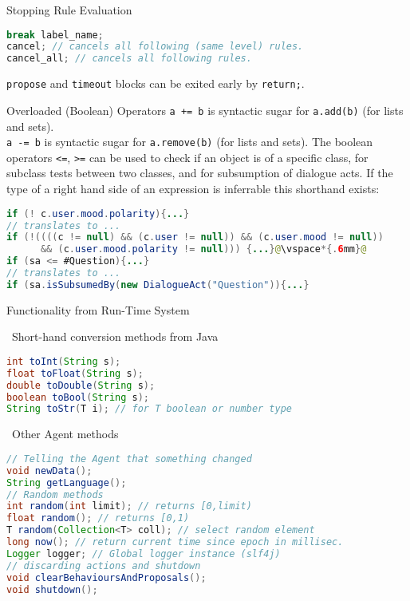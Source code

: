 \documentclass[5pt]{article}
\newcommand{\intitle}[1]{\rule{0pt}{2ex}\ #1}
\begin{document}
\begin{multicols}{2}
\begin{bodybox}{Stopping Rule Evaluation}
            \begin{lstlisting}[language=Java]
break label_name;
cancel; // cancels all following (same level) rules.
cancel_all; // cancels all following rules.
            \end{lstlisting}
            \verb|propose| and \verb|timeout| blocks can be exited early by \verb|return;|.
        \end{bodybox}
        \begin{bodybox}{Overloaded (Boolean) Operators}
            \verb|a += b| is syntactic sugar for \verb|a.add(b)| (for lists and sets).\\
            \verb|a -= b| is syntactic sugar for \verb|a.remove(b)| (for lists and sets).
        The boolean operators \verb|<=|, \verb|>=| can be used to check if an object is of a specific class, for subclass tests between two classes, and for subsumption of dialogue acts.
        If the type of a right hand side of an expression is inferrable this shorthand exists:
        \begin{lstlisting}[language=Java, escapechar=@]
if (! c.user.mood.polarity){...}
// translates to ...
if (!((((c != null) && (c.user != null)) && (c.user.mood != null))
      && (c.user.mood.polarity != null))) {...}@\vspace*{.6mm}@
if (sa <= #Question){...}
// translates to ...
if (sa.isSubsumedBy(new DialogueAct("Question")){...}
        \end{lstlisting}
        \end{bodybox}
        \begin{bodybox}{Functionality from Run-Time System}
        \intitle{Short-hand conversion methods from Java}
        \begin{lstlisting}[language=Java]
int toInt(String s);
float toFloat(String s);
double toDouble(String s);
boolean toBool(String s);
String toStr(T i); // for T boolean or number type
        \end{lstlisting}
        \intitle{Other Agent methods}
        \begin{lstlisting}[language=Java]
// Telling the Agent that something changed
void newData();
String getLanguage();
// Random methods
int random(int limit); // returns [0,limit)
float random(); // returns [0,1)
T random(Collection<T> coll); // select random element
long now(); // return current time since epoch in millisec.
Logger logger; // Global logger instance (slf4j)
// discarding actions and shutdown
void clearBehavioursAndProposals();
void shutdown();
        \end{lstlisting}

\end{bodybox}
\end{multicols}
\end{document}
